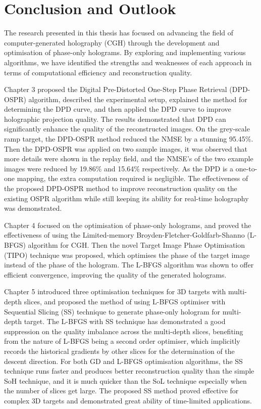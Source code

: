
\chapter{Conclusion and Outlook}

The research presented in this thesis has focused on advancing the field of computer-generated holography (CGH) through the development and optimisation of phase-only holograms. By exploring and implementing various algorithms, we have identified the strengths and weaknesses of each approach in terms of computational efficiency and reconstruction quality.

Chapter 3 proposed the Digital Pre-Distorted One-Step Phase Retrieval (DPD-OSPR) algorithm, described the experimental setup, explained the method for determining the DPD curve, and then applied the DPD curve to improve holographic projection quality. The results demonstrated that DPD can significantly enhance the quality of the reconstructed images. On the grey-scale ramp target, the DPD-OSPR method reduced the NMSE by a stunning 95.45\%. Then the DPD-OSPR was applied on two sample images, it was observed that more details were shown in the replay field, and the NMSE's of the two example images were reduced by 19.86\% and 15.64\% respectively. As the DPD is a one-to-one mapping, the extra computation required is negligible. The effectiveness of the proposed DPD-OSPR method to improve reconstruction quality on the existing OSPR algorithm while still keeping its ability for real-time holography was demonstrated.

Chapter 4 focused on the optimisation of phase-only holograms, and proved the effectiveness of using the Limited-memory Broyden-Fletcher-Goldfarb-Shanno (L-BFGS) algorithm for CGH. Then the novel Target Image Phase Optimisation (TIPO) technique was proposed, which optimises the phase of the target image instead of the phase of the hologram. The L-BFGS algorithm was shown to offer efficient convergence, improving the quality of the generated holograms.

Chapter 5 introduced three optimisation techniques for 3D targets with multi-depth slices, and proposed the method of using L-BFGS optimiser with Sequential Slicing (SS) technique to generate phase-only hologram for multi-depth target. The L-BFGS with SS technique has demonstrated a good suppression on the quality imbalance across the multi-depth slices, benefiting from the nature of L-BFGS being a second order optimiser, which implicitly records the historical gradients by other slices for the determination of the descent direction. For both GD and L-BFGS optimisation algorithms, the SS technique runs faster and produces better reconstruction quality than the simple SoH technique, and it is much quicker than the SoL technique especially when the number of slices get large. The proposed SS method proved effective for complex 3D targets and demonstrated great ability of time-limited applications.

